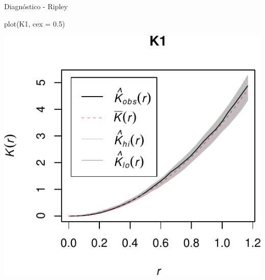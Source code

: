 \documentclass[
  11pt,
  ignorenonframetext,
]{beamer}
\newenvironment{Shaded}{}{}
\newcommand{\AttributeTok}[1]{\textcolor[rgb]{0.49,0.56,0.16}{#1}}
\newcommand{\FloatTok}[1]{\textcolor[rgb]{0.25,0.63,0.44}{#1}}
\newcommand{\FunctionTok}[1]{\textcolor[rgb]{0.02,0.16,0.49}{#1}}
\newcommand{\NormalTok}[1]{#1}
\begin{document}
\begin{frame}[fragile]{Diagnóstico - Ripley}
\protect\hypertarget{diagnuxf3stico---ripley-1}{}
\begin{Shaded}
\begin{Highlighting}[]
\FunctionTok{plot}\NormalTok{(K1, }\AttributeTok{cex =} \FloatTok{0.5}\NormalTok{)}
\end{Highlighting}
\end{Shaded}

\begin{center}\includegraphics{Tutorial-spatstat-2_files/figure-beamer/unnamed-chunk-20-1} \end{center}
\end{frame}
\end{document}
